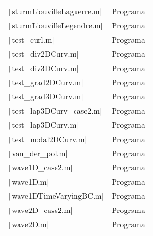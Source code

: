 \begin{table}[ht!]
\begin{tabular}{|l|l|}
		\texttt|sturmLiouvilleLaguerre.m|                                                                                & Programa    \\
		\texttt|sturmLiouvilleLegendre.m|                                                                                & Programa    \\
		\texttt|test_curl.m|                                                                                             & Programa    \\
		\texttt|test_div2DCurv.m|                                                                                        & Programa    \\
		\texttt|test_div3DCurv.m|                                                                                        & Programa    \\
		\texttt|test_grad2DCurv.m|                                                                                       & Programa    \\
		\texttt|test_grad3DCurv.m|                                                                                       & Programa    \\
		\texttt|test_lap3DCurv_case2.m|                                                                                  & Programa    \\
		\texttt|test_lap3DCurv.m|                                                                                        & Programa    \\
		\texttt|test_nodal2DCurv.m|                                                                                      & Programa    \\
		\texttt|van_der_pol.m|                                                                                           & Programa    \\
		\texttt|wave1D_case2.m|                                                                                          & Programa    \\
		\texttt|wave1D.m|                                                                                                & Programa    \\
		\texttt|wave1DTimeVaryingBC.m|                                                                                   & Programa    \\
		\texttt|wave2D_case2.m|                                                                                          & Programa    \\
		\texttt|wave2D.m|                                                                                                & Programa    \\
		\bottomrule
	\end{tabular}
\end{table}


